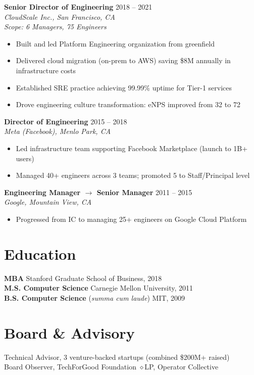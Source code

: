 \documentclass[11pt,a4paper]{article}
\begin{document}
\noindent\textbf{Senior Director of Engineering} \hfill 2018 -- 2021\\
\textit{CloudScale Inc., San Francisco, CA}\\
\textit{Scope: 6 Managers, 75 Engineers}
\begin{itemize}[leftmargin=1.5em,nosep,label={\color{accent}---}]
\item Built and led Platform Engineering organization from greenfield
\item Delivered cloud migration (on-prem to AWS) saving \$8M annually in infrastructure costs
\item Established SRE practice achieving 99.99\% uptime for Tier-1 services
\item Drove engineering culture transformation: eNPS improved from 32 to 72
\end{itemize}
\vspace{0.6em}

\noindent\textbf{Director of Engineering} \hfill 2015 -- 2018\\
\textit{Meta (Facebook), Menlo Park, CA}
\begin{itemize}[leftmargin=1.5em,nosep,label={\color{accent}---}]
\item Led infrastructure team supporting Facebook Marketplace (launch to 1B+ users)
\item Managed 40+ engineers across 3 teams; promoted 5 to Staff/Principal level
\end{itemize}
\vspace{0.6em}

\noindent\textbf{Engineering Manager $\rightarrow$ Senior Manager} \hfill 2011 -- 2015\\
\textit{Google, Mountain View, CA}
\begin{itemize}[leftmargin=1.5em,nosep,label={\color{accent}---}]
\item Progressed from IC to managing 25+ engineers on Google Cloud Platform
\end{itemize}

\section{Education}
\noindent\textbf{MBA} \hfill Stanford Graduate School of Business, 2018\\
\textbf{M.S. Computer Science} \hfill Carnegie Mellon University, 2011\\
\textbf{B.S. Computer Science} (\textit{summa cum laude}) \hfill MIT, 2009

\section{Board \& Advisory}
\noindent Technical Advisor, 3 venture-backed startups (combined \$200M+ raised)\\
Board Observer, TechForGood Foundation \quad$\diamond$\quad LP, Operator Collective
\end{document}
